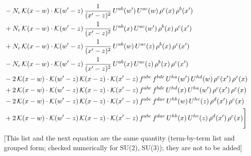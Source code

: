 \documentclass[9pt]{article}
\numberwithin{equation}{section}
\begin{document}
\begin{align}
&-N_{c}\,\mathcal{K}(x-w)\cdot\mathcal{K}(w'-z)\,\frac{1}{(x'-z)^{2}}\,U^{ab}(w')\,U^{ac}(w)\,\rho^{c}(x)\,\rho^{b}(x')\notag \\ & +N_{c}\,\mathcal{K}(x-w)\cdot\mathcal{K}(w'-z)\,\frac{1}{(x'-z)^{2}}\,U^{ab}(x)\,U^{ac}(w')\,\rho^{b}(x)\,\rho^{c}(x')\notag\\
&+N_{c}\,\mathcal{K}(x-w)\cdot\mathcal{K}(w'-z)\,\frac{1}{(x'-z)^{2}}\,U^{ab}(w)\,U^{ac}(z)\,\rho^{b}(x)\,\rho^{c}(x')\notag\\
&-N_{c}\,\mathcal{K}(x-w)\cdot\mathcal{K}(w'-z)\,\frac{1}{(x'-z)^{2}}\,U^{ab}(x)\,U^{ac}(z)\,\rho^{b}(x)\,\rho^{c}(x')\notag\\
&-2\,\mathcal{K}(x-w)\cdot\mathcal{K}(w'-z)\,\mathcal{K}(x-z)\cdot\mathcal{K}(x'-z)\,f^{abc}\,f^{bde}\,U^{ha}(w')\,U^{hd}(w)\,\rho^{c}(x')\,\rho^{e}(x)\notag\\
&+2\,\mathcal{K}(x-w)\cdot\mathcal{K}(w'-z)\,\mathcal{K}(x-z)\cdot\mathcal{K}(x'-z)\,f^{abc}\,f^{bde}\,U^{hd}(x)\,U^{ha}(w')\,\rho^{c}(x')\,\rho^{e}(x)\notag\\
&-2\,\mathcal{K}(x-w)\cdot\mathcal{K}(w'-z)\,\mathcal{K}(x-z)\cdot\mathcal{K}(x'-z)\,f^{abc}\,f^{dae}\,U^{hb}(w)\,U^{he}(z)\,\rho^{d}(x')\,\rho^{c}(x)\notag\\
&+2\,\mathcal{K}(x-w)\cdot\mathcal{K}(w'-z)\,\mathcal{K}(x-z)\cdot\mathcal{K}(x'-z)\,f^{abc}\,f^{dae}\,U^{hb}(x)\,U^{he}(z)\,\rho^{d}(x')\,\rho^{c}(x)\Bigg]
\end{align} {\color{red}[This list and the next equation are the same quantity (term-by-term list and grouped form; checked numerically for SU(2), SU(3)); they are not to be added]}\par\noindent
\end{document}
